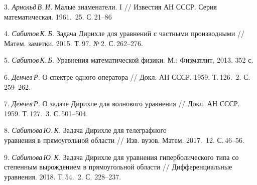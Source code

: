 3. {\it Арнольд\,В.\,И.} Малые знаменатели. I // Известия АН СССР. Серия математическая. 1961. \No\,25. С.\,21--86

4. {\it Сабитов\,К.\,Б.} Задача Дирихле для уравнений с частными производными // Матем. заметки. 2015. Т.\,97. №\,2. С.\,262--276.

5. {\it Сабитов\,К.\,Б.} Уравнения математической физики. М.: Физматлит, 2013. 352 с.

6. {\it Денчев\,Р.} О спектре одного оператора // Докл. АН СССР. 1959. Т.\,126. \No\,2. С.\,259--262.

7. {\it Денчев\,Р.} О задаче Дирихле для волнового уравнения // Докл. АН СССР. 1959. Т.\,127. \No\,3. С.\,501--504.

8. {\it Сабитова\,Ю.\,К.} Задача Дирихле для телеграфного\\уравнения в прямоугольной области // Изв. вузов. Матем. 2017. \No\,12. С.\,46--56.

9. {\it Сабитова\,Ю.\,К.} Задача Дирихле для уравнения гиперболического типа со степенным вырождением в прямоугольной области // Дифференциальные уравнения. 2018. Т.\,54. \No\,2. С. 228--237.

